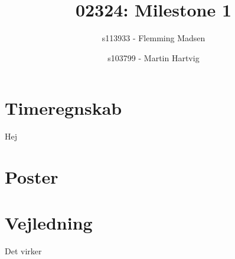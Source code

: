 \documentclass[a4paper]{article}
\title{02324: Milestone 1}
\author{
  s113933 - Flemming Madsen
  \and
    s103799 - Martin Hartvig
}
\begin{document}
\maketitle

\clearpage

\tableofcontents

\clearpage

\section{Timeregnskab} %
\label{sec:Timeregnskab}

Hej


\section{Poster} %
\label{sec:Poster}

\clearpage


\clearpage

\section{Vejledning} %
\label{sec:Vejledning}
Det virker

\end{document}
